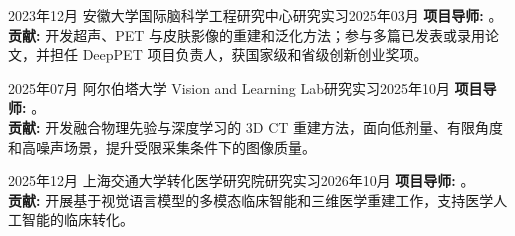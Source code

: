 
\begin{experiences}
\experience
   {2023年12月}   {安徽大学国际脑科学工程研究中心}{研究实习}{2025年03月}
    {\textbf{项目导师:} 。\\ \textbf{贡献:} 开发超声、PET 与皮肤影像的重建和泛化方法；参与多篇已发表或录用论文，并担任 DeepPET 项目负责人，获国家级和省级创新创业奖项。}
    {}

\experience
   {2025年07月}   {阿尔伯塔大学 Vision and Learning Lab}{研究实习}{2025年10月}
  {\textbf{项目导师:} 。\\ \textbf{贡献:} 开发融合物理先验与深度学习的 3D CT 重建方法，面向低剂量、有限角度和高噪声场景，提升受限采集条件下的图像质量。}
  {}

\experience
   {2025年12月}   {上海交通大学转化医学研究院}{研究实习}{2026年10月}
  {\textbf{项目导师:} 。\\ \textbf{贡献:} 开展基于视觉语言模型的多模态临床智能和三维医学重建工作，支持医学人工智能的临床转化。}
  {}

\end{experiences}



